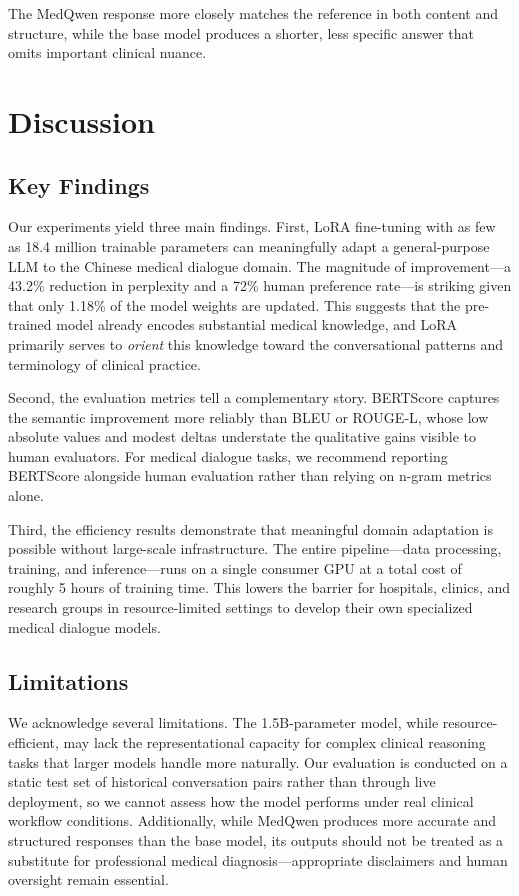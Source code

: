 \documentclass[11pt,a4paper]{article}
\begin{document}
The MedQwen response more closely matches the reference in both content and structure, while the base model produces a shorter, less specific answer that omits important clinical nuance.

\section{Discussion}
\label{sec:discussion}

\subsection{Key Findings}

Our experiments yield three main findings. First, LoRA fine-tuning with as few as 18.4 million trainable parameters can meaningfully adapt a general-purpose LLM to the Chinese medical dialogue domain. The magnitude of improvement---a 43.2\% reduction in perplexity and a 72\% human preference rate---is striking given that only 1.18\% of the model weights are updated. This suggests that the pre-trained model already encodes substantial medical knowledge, and LoRA primarily serves to \textit{orient} this knowledge toward the conversational patterns and terminology of clinical practice.

Second, the evaluation metrics tell a complementary story. BERTScore captures the semantic improvement more reliably than BLEU or ROUGE-L, whose low absolute values and modest deltas understate the qualitative gains visible to human evaluators. For medical dialogue tasks, we recommend reporting BERTScore alongside human evaluation rather than relying on n-gram metrics alone.

Third, the efficiency results demonstrate that meaningful domain adaptation is possible without large-scale infrastructure. The entire pipeline---data processing, training, and inference---runs on a single consumer GPU at a total cost of roughly 5 hours of training time. This lowers the barrier for hospitals, clinics, and research groups in resource-limited settings to develop their own specialized medical dialogue models.

\subsection{Limitations}

We acknowledge several limitations. The 1.5B-parameter model, while resource-efficient, may lack the representational capacity for complex clinical reasoning tasks that larger models handle more naturally. Our evaluation is conducted on a static test set of historical conversation pairs rather than through live deployment, so we cannot assess how the model performs under real clinical workflow conditions. Additionally, while MedQwen produces more accurate and structured responses than the base model, its outputs should not be treated as a substitute for professional medical diagnosis---appropriate disclaimers and human oversight remain essential.
\end{document}

